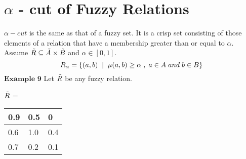 \documentclass{article}
\begin{document}
\section{$\alpha$ - cut of Fuzzy Relations}
$\alpha-cut$ is the same as that of a fuzzy set. It is a crisp set consisting of those elements of a relation that have a membership greater than or equal to $\alpha$. Assume $\Tilde{R}\subseteq \Tilde{A}\times\Tilde{B}$ and $\alpha \in[0,1]$.
\begin{equation}
    R_{\alpha}=\{(a,b)\hspace{0.1cm}\mid\hspace{0.1cm}\mu(a,b)\geq\alpha\hspace{0.1cm},\hspace{0.1cm}a\in{A}\hspace{0.1cm} and \hspace{0.1cm}b\in{B}\}
\end{equation}      
$\textbf{Example 9}$\newline
Let $\Tilde{R}$ be any fuzzy relation.
\begin{center}
$\Tilde{R}$ =
\def\arraystretch{1.4}%
\begin{tabular}{ | m{1cm} | m{1cm}| m{1cm} | } 
  \hline
  0.9 & 0.5 &0  \\ 
  \hline
    0.6& 1.0 &0.4  \\ 
  \hline
   0.7&0.2  & 0.1 \\ 
  \hline
\end{tabular}
\end{center}
\end{document}
